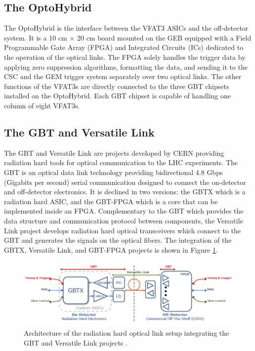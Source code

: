     \subsection{The OptoHybrid}

      The OptoHybrid is the interface between the VFAT3 ASICs and the off-detector system. It is a 10 cm $ \times $ 20 cm board mounted on the GEB equipped with a Field Programmable Gate Array (FPGA) and Integrated Circuits (ICs) dedicated to the operation of the optical links. The FPGA solely handles the trigger data by applying zero suppression algorithms, formatting the data, and sending it to the CSC and the GEM trigger system separately over two optical links. The other functions of the VFAT3s are directly connected to the three GBT chipsets installed on the OptoHybrid. Each GBT chipset is capable of handling one column of eight VFAT3s.

    \subsection{The GBT and Versatile Link}
    \label{sec:II-2-gbt}

      The GBT \cite{Moreira:1235836} and Versatile Link \cite{Soos:1609037} are projects developed by CERN providing radiation hard tools for optical communication to the LHC experiments. The GBT is an optical data link technology providing bidirectional 4.8 Gbps (Gigabits per second) serial communication designed to connect the on-detector and off-detector electronics. It is declined in two versions: the GBTX which is a radiation hard ASIC, and the GBT-FPGA which is a core that can be implemented inside an FPGA. Complementary to the GBT which provides the data structure and communication protocol between components, the Versatile Link project develops radiation hard optical transceivers which connect to the GBT and generates the signals on the optical fibers. The integration of the GBTX, Versatile Link, and GBT-FPGA projects is shown in Figure \ref{fig:II-2-gbt-versatile}. \\

      \begin{figure}[b!]
        \centering
        \includegraphics[width=\textwidth]{img/II-2-daq/gbt-versatile.pdf}
        \caption{Architecture of the radiation hard optical link setup integrating the GBT and Versatile Link projects \cite{Moreira:1235836}.}
        \label{fig:II-2-gbt-versatile}
      \end{figure}

